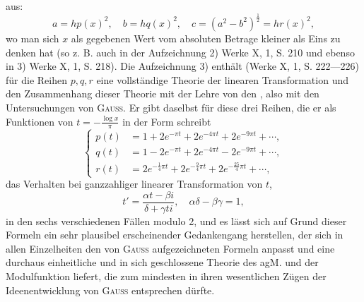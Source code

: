 aus:
\begingroup\makeatletter\tagsleft@true\let\veqno\leqno\makeatother
\begin{equation*}
a=hp(x)^2,\quad b=hq(x)^2,\quad c=(a^2-b^2)^{\frac12}=hr(x)^2,\tag{11}
\end{equation*}
\endgroup
\noindent wo man sich \(x\) als gegebenen Wert vom absoluten Betrage kleiner als Eins
zu denken hat (so z. B. auch in der Aufzeichnung 2) Werke X, 1, S. 210
und ebenso in 3) Werke X, 1, S. 218). Die Aufzeichnung 3) enthält (Werke
X, 1, S. 222—226) für die Reihen \(p,q,r\) eine vollständige Theorie der linearen
Transformation und den Zusammenhang dieser Theorie mit der Lehre von
den , also mit den  Untersuchungen
von \textsc{Gauss}. Er gibt daselbst für diese drei Reihen, die er als
Funktionen von \(t=-\frac{\log x}\pi\) in der Form schreibt
\begingroup\makeatletter\tagsleft@true\let\veqno\leqno\makeatother
\begin{equation*}
\left\{\begin{aligned}
p(t)&=1+2e^{-\pi t}+2e^{-4\pi t}+2e^{-9\pi t}+\cdots,\\
q(t)&=1-2e^{-\pi t}+2e^{-4\pi t}-2e^{-9\pi t}+\cdots,\\
r(t)&=2e^{-\frac14\pi t}+2e^{-\frac94\pi t}+2e^{-\frac{25}4\pi t}+\cdots,
\end{aligned}\right.\tag{12}
\end{equation*}
\endgroup
\noindent das Verhalten bei ganzzahliger linearer Transformation von \(t\),
\begingroup\makeatletter\tagsleft@true\let\veqno\leqno\makeatother
\begin{equation*}
t'=\frac{\alpha t-\beta i}{\delta+\gamma ti},\quad\alpha\delta-\beta\gamma=1,\tag{13}
\end{equation*}
\endgroup
\noindent in den sechs verschiedenen Fällen modulo 2, und es lässt sich auf Grund
dieser Formeln ein sehr plausibel erscheinender Gedankengang herstellen, der
sich in allen Einzelheiten den von \textsc{Gauss} aufgezeichneten Formeln anpasst
und eine durchaus einheitliche und in sich geschlossene Theorie des agM.
und der Modulfunktion liefert, die zum mindesten in ihren wesentlichen Zügen
der Ideenentwicklung von \textsc{Gauss} entsprechen dürfte.

